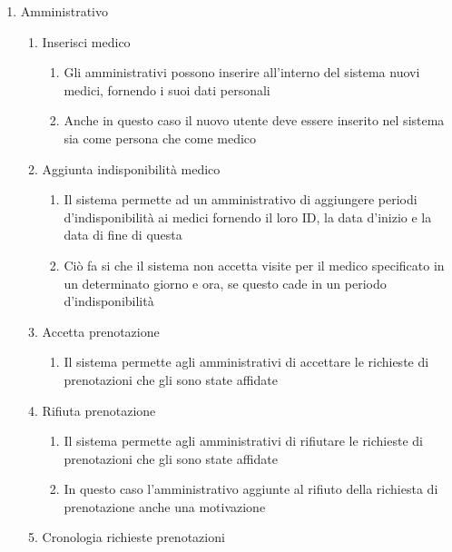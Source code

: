 \documentclass[12pt]{report}
\begin{document}
\begin{enumerate}
\begin{enumerate}
\begin{enumerate}
                    \end{enumerate}
            \end{enumerate}
        \item Amministrativo
            \begin{enumerate}
                \item Inserisci medico
                    \begin{enumerate}
                        \item Gli amministrativi  possono inserire all'interno del sistema nuovi medici, fornendo i suoi dati personali 
                        \item Anche in questo caso il nuovo utente deve essere inserito nel sistema sia come persona che come medico 
                    \end{enumerate}
                \item Aggiunta indisponibilità medico
                    \begin{enumerate}
                        \item Il sistema permette ad un amministrativo di aggiungere periodi d'indisponibilità ai medici fornendo il loro ID, la data d'inizio e la data di fine di questa
                        \item Ciò fa si che il sistema non accetta visite per il medico specificato in un determinato giorno e ora, se questo cade in un periodo  d'indisponibilità
                    \end{enumerate}
                \item Accetta prenotazione
                    \begin{enumerate}
                        \item Il sistema permette agli amministrativi di accettare le richieste di prenotazioni che gli sono state affidate
                    \end{enumerate}
                \item Rifiuta prenotazione
                    \begin{enumerate}
                        \item Il sistema permette agli amministrativi di rifiutare le richieste di prenotazioni che gli sono state affidate
                        \item In questo caso l'amministrativo aggiunte al rifiuto della richiesta di prenotazione anche una motivazione 
                    \end{enumerate}
                \item Cronologia richieste prenotazioni

\end{enumerate}
\end{enumerate}
\end{document}
